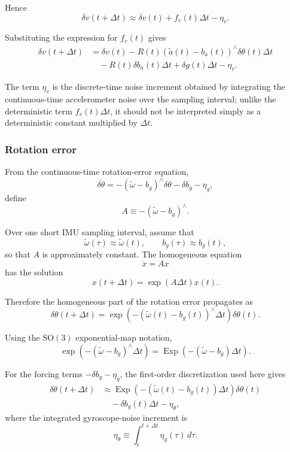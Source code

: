 \documentclass[11pt]{article}
\numberwithin{equation}{section}
\newcommand{\Exp}{\operatorname{Exp}}
\newcommand{\SO}{\mathrm{SO}}
\begin{document}
Hence
\[
\delta v(t+\Delta t)
\approx
\delta v(t)+f_v(t)\Delta t-\eta_v.
\]

Substituting the expression for $f_v(t)$ gives
\begin{equation}
\boxed{
\begin{aligned}
\delta v(t+\Delta t)
&=
\delta v(t)
-R(t)(\tilde a(t)-b_a(t))^\wedge
 \delta\theta(t)\Delta t\\
&\quad
-R(t)\delta b_a(t)\Delta t
+\delta g(t)\Delta t
-\eta_v.
\end{aligned}
}
\end{equation}

The term $\eta_v$ is the discrete-time noise increment obtained by
integrating the continuous-time accelerometer noise over the sampling
interval; unlike the deterministic term $f_v(t)\Delta t$, it should not
be interpreted simply as a deterministic constant multiplied by
$\Delta t$.


\subsubsection*{Rotation error}

From the continuous-time rotation-error equation,
\[
\delta\dot\theta
=
-(\tilde\omega-b_g)^\wedge\delta\theta
-\delta b_g
-\eta_g,
\]
define
\[
A
\equiv
-(\tilde\omega-b_g)^\wedge.
\]

Over one short IMU sampling interval, assume that
\[
\tilde\omega(\tau)\approx\tilde\omega(t),
\qquad
b_g(\tau)\approx b_g(t),
\]
so that $A$ is approximately constant.  The homogeneous equation
\[
\dot x=Ax
\]
has the solution
\[
x(t+\Delta t)=\exp(A\Delta t)x(t).
\]

Therefore the homogeneous part of the rotation error propagates as
\[
\delta\theta(t+\Delta t)
=
\exp\!\left(
-(\tilde\omega(t)-b_g(t))^\wedge\Delta t
\right)\delta\theta(t).
\]

Using the $\SO(3)$ exponential-map notation,
\[
\exp\!\left(
-(\tilde\omega-b_g)^\wedge\Delta t
\right)
=
\Exp\!\left(
-(\tilde\omega-b_g)\Delta t
\right).
\]

For the forcing terms $-\delta b_g-\eta_g$, the first-order
discretization used here gives
\begin{equation}
\boxed{
\begin{aligned}
\delta\theta(t+\Delta t)
&\approx
\Exp\!\left(
-(\tilde\omega(t)-b_g(t))\Delta t
\right)\delta\theta(t)
\\
&\quad
-\delta b_g(t)\Delta t
-\eta_\theta,
\end{aligned}
}
\end{equation}
where the integrated gyroscope-noise increment is
\begin{equation}
\boxed{
\eta_\theta
\equiv
\int_t^{t+\Delta t}\eta_g(\tau)\,d\tau.
}
\end{equation}
\end{document}
